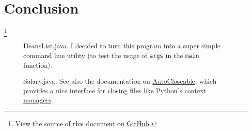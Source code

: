 \documentclass[leqno, 11pt]{article}
\newcommand\blfootnote[1]{%
  \begingroup
    \renewcommand\thefootnote{}\footnote{#1}
    \addtocounter{footnote}{-1}
  \endgroup
}
\begin{document}
\section*{Conclusion}
\blfootnote{View the source of this document on \href{https://github.com/bjd2385/IFT_194_labs/blob/master/\jobname.tex}{GitHub}.}
\newpage
\begin{figure}
  \centering
  
  \caption{DeansList.java. I decided to turn this program into a super simple command line utility (to test the usage of \texttt{args} in the \texttt{main} function).}
  \label{fig:one}
\end{figure}
\begin{figure}
  \centering
  
  \caption{Salary.java. See also the documentation on \href{https://docs.oracle.com/javase/10/docs/api/java/lang/AutoCloseable.html}{AutoCloseable}, which provides a nice interface for closing files like Python's \href{https://docs.python.org/3/reference/compound_stmts.html\#with}{context managers}.}
  \label{fig:two}
\end{figure}
\end{document}
